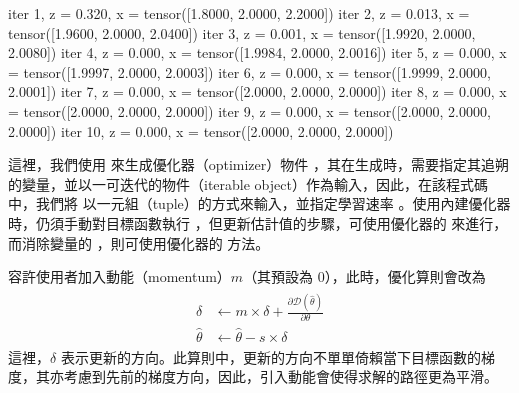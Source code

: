 \documentclass[letterpaper,10pt,english]{sphinxmanual}
\begin{document}
\begin{sphinxVerbatim}[commandchars=\\\{\}]
iter  1, z = 0.320, x = tensor([1.8000, 2.0000, 2.2000])
iter  2, z = 0.013, x = tensor([1.9600, 2.0000, 2.0400])
iter  3, z = 0.001, x = tensor([1.9920, 2.0000, 2.0080])
iter  4, z = 0.000, x = tensor([1.9984, 2.0000, 2.0016])
iter  5, z = 0.000, x = tensor([1.9997, 2.0000, 2.0003])
iter  6, z = 0.000, x = tensor([1.9999, 2.0000, 2.0001])
iter  7, z = 0.000, x = tensor([2.0000, 2.0000, 2.0000])
iter  8, z = 0.000, x = tensor([2.0000, 2.0000, 2.0000])
iter  9, z = 0.000, x = tensor([2.0000, 2.0000, 2.0000])
iter 10, z = 0.000, x = tensor([2.0000, 2.0000, 2.0000])
\end{sphinxVerbatim}

這裡，我們使用  來生成優化器（optimizer）物件 ，其在生成時，需要指定其追朔的變量，並以一可迭代的物件（iterable object）作為輸入，因此，在該程式碼中，我們將  以一元組（tuple）的方式來輸入，並指定學習速率 。使用內建優化器時，仍須手動對目標函數執行 ，但更新估計值的步驟，可使用優化器的  來進行，而消除變量的 ，則可使用優化器的  方法。

 容許使用者加入動能（momentum）\(m\)（其預設為 0），此時，優化算則會改為
\begin{equation*}
\begin{split}
\begin{aligned}
\delta & \leftarrow m \times  \delta + \frac{\partial \mathcal{D}(\widehat{\theta})}{\partial \theta} \\
\widehat{\theta} &\leftarrow \widehat{\theta} - s \times \delta
\end{aligned}
\end{split}
\end{equation*}
這裡，\(\delta\) 表示更新的方向。此算則中，更新的方向不單單倚賴當下目標函數的梯度，其亦考慮到先前的梯度方向，因此，引入動能會使得求解的路徑更為平滑。
\end{document}
